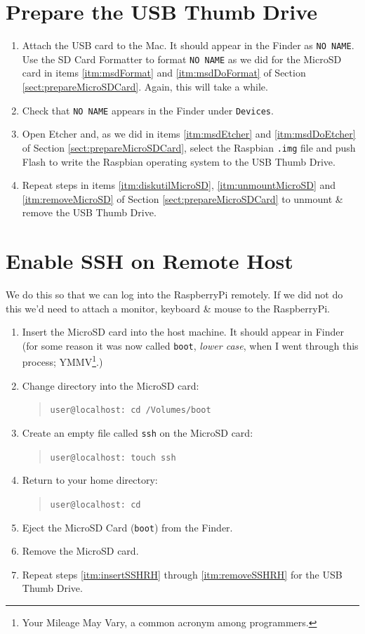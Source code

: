 \documentclass[11pt,oneside]{article}
\makeatletter
\newcommand{\localCommand}[1]{\begin{quote} \texttt{user@localhost: #1} \end{quote}}
\makeatother
\begin{document}
\section{Prepare the USB Thumb Drive}
\begin{enumerate}
	\item Attach the USB card to the Mac.  It should appear in the Finder as \texttt{NO NAME}.  Use the SD Card Formatter to format \texttt{NO NAME} as we did for the MicroSD card
	in items \ref{itm:msdFormat} and \ref{itm:msdDoFormat} of Section \ref{sect:prepareMicroSDCard}.  Again, this will take a while.
	\item Check that \texttt{NO NAME} appears in the Finder under \texttt{Devices}.
	\item Open Etcher and, as we did in items \ref{itm:msdEtcher} and \ref{itm:msdDoEtcher} of Section \ref{sect:prepareMicroSDCard}, select the Raspbian \texttt{.img} file and push Flash
	to write the Raspbian operating system to the USB Thumb Drive.
	\item Repeat steps in items \ref{itm:diskutilMicroSD}, \ref{itm:unmountMicroSD} and \ref{itm:removeMicroSD} of Section \ref{sect:prepareMicroSDCard} to unmount \& remove the USB
	Thumb Drive.
\end{enumerate}

\section{Enable SSH on Remote Host}
We do this so that we can log into the RaspberryPi remotely.  If we did not do this we'd need to attach a monitor, keyboard \& mouse to the RaspberryPi.
\begin{enumerate}
	\item \label{itm:insertSSHRH} Insert the MicroSD card into the host machine.  It should appear in Finder (for some reason it was now called \texttt{boot}, {\em lower case}, when I
	went through this process; YMMV\footnote{Your Mileage May Vary, a common acronym among programmers.}.)
	\item \label{itm:cdSSHRH} Change directory into the MicroSD card: \localCommand{cd /Volumes/boot}
	\item \label{itm:createSSHSSHRH} Create an empty file called \texttt{ssh} on the MicroSD card: \localCommand{touch ssh}
	\item \label{itm:cdHomeSSHRH} Return to your home directory: \localCommand{cd}
	\item \label{itm:ejectSSHRH} Eject the MicroSD Card (\texttt{boot}) from the Finder.
	\item \label{itm:removeSSHRH} Remove the MicroSD card.
	\item Repeat steps \ref{itm:insertSSHRH} through \ref{itm:removeSSHRH} for the USB Thumb Drive.
\end{enumerate}
\end{document}
